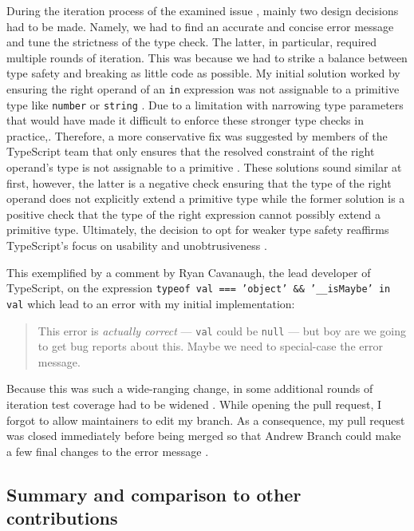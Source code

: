 \documentclass[12pt]{scrartcl}
\def\code#1{\texttt{\frenchspacing#1}}
\begin{document}
During the iteration process of the examined issue \cite{41928}, mainly two design decisions had to be made. Namely, we had to find an accurate and concise error message and tune the strictness of the type check. The latter, in particular, required multiple rounds of iteration. This was because we had to strike a balance between type safety and breaking as little code as possible. My initial solution worked by ensuring the right operand of an \code{in} expression was not assignable to a primitive type like \code{number} or \code{string} \cite{41928Comment1}. Due to a limitation with narrowing type parameters \cite{13995} that would have made it difficult to enforce these stronger type checks in practice,. Therefore, a more conservative fix was suggested by members of the TypeScript team that only ensures that the resolved constraint of the right operand's type is not assignable to a primitive \cite{41928Comment2}. These solutions sound similar at first, however, the latter is a negative check ensuring that the type of the right operand does not explicitly extend a primitive type while the former solution is a positive check that the type of the right expression cannot possibly extend a primitive type. Ultimately, the decision to opt for weaker type safety reaffirms TypeScript's focus on usability and unobtrusiveness \cite{RyanDonovan2020}.

This exemplified by a comment by Ryan Cavanaugh, the lead developer of TypeScript, on the expression \code{typeof val === 'object' \&\& '\_\_isMaybe' in val} which lead to an error with my initial implementation:

\begin{quote}
    This error is \textit{actually correct} --- \code{val} could be \code{null} --- but boy are we going to get bug reports about this. Maybe we need to special-case the error message. \cite{41928Comment3}
\end{quote}

Because this was such a wide-ranging change, in some additional rounds of iteration test coverage had to be widened \cite{41928Comment4}. While opening the pull request, I forgot to allow maintainers to edit my branch. As a consequence, my pull request was closed immediately before being merged so that Andrew Branch could make a few final changes to the error message \cite{42288}.

\subsection{Summary and comparison to other contributions}
\end{document}
